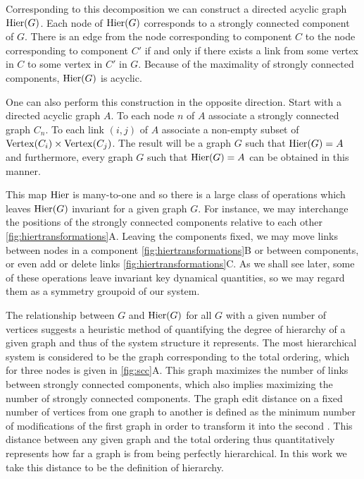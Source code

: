 Corresponding to this decomposition we can construct a directed acyclic graph $\mathrm{Hier} (G)$.  Each node of $\mathrm{Hier} (G)$ corresponds to a strongly connected component of $G$. There is an edge from the node corresponding to component $C$ to the node corresponding to component $C'$ if and only if there exists a link from some vertex in $C$ to some vertex in $C'$ in $G$.  Because of the maximality of strongly connected components, $\mathrm{Hier} (G)$ is acyclic.

One can also perform this construction in the opposite direction.  Start with a directed acyclic graph $A$.  To each node $n$ of $A$ associate
a strongly connected graph $C_n$.  To each link $(i,j)$ of $A$ associate a non-empty subset of $\mathrm{Vertex}(C_i) \times \mathrm{Vertex}(C_j)$.  The result will be a graph $G$ such that $\mathrm{Hier}(G) = A$ and furthermore, every graph $G$ such that $\mathrm{Hier}(G) = A$ can be obtained in this manner.

This map $\mathrm{Hier}$ is many-to-one and so there is a large class of
operations which leaves $\mathrm{Hier}(G)$ invariant for a given graph $G$.
For instance, we may interchange the positions of the strongly
connected components relative to each other \ref{fig:hiertransformations}A.  Leaving the components fixed, we may move links between nodes in a component \ref{fig:hiertransformations}B or between components, or even add or delete links \ref{fig:hiertransformations}C.  As we shall see later, some of these operations leave invariant key dynamical quantities, so we may regard them as a symmetry groupoid of our system.

The relationship between $G$ and $\mathrm{Hier}(G)$ for all $G$ with a given number of vertices suggests a heuristic method of quantifying the degree of hierarchy of a given graph and thus of the system structure it represents. The most hierarchical system is considered to be the graph corresponding to the total ordering, which for three nodes is given in \ref{fig:scc}A. This graph maximizes the number of links between strongly connected components, which also implies maximizing the number of strongly connected components. The graph edit distance on a fixed number of vertices from one graph to another is defined as the minimum number of modifications of the first graph in order to transform it into the second \cite{Axenovich2011}. This distance between any given graph and the total ordering thus quantitatively represents how far a graph is from being perfectly hierarchical. In this work we take this distance to be the definition of hierarchy.


